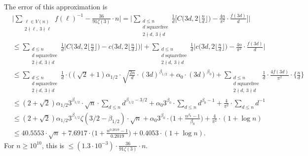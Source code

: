\documentclass{article}
\theoremstyle{plain}
\theoremstyle{definition}
\theoremstyle{remark}
\begin{document}
The error of this approximation is
\begin{align*}
&\bigg|\sum_{\substack{\ell\in V(n)\\2\nmid\ell,~3\nmid\ell}}f(\ell)^{-1}-\frac{36}{91\zeta(3)}\cdot n\bigg|
=\bigg|\sum_{\substack{d\leq n\\d\text{ squarefree}\\2\nmid d,~3\nmid d}}\frac{1}{d}\bigg[
C\bigg(3d,2\bigg\lfloor\frac{n}{d}\bigg\rfloor\bigg)
-\frac{4n}{\pi^2}\cdot \frac{f(3d)}{d}
\bigg]\bigg|\\
&\leq\sum_{\substack{d\leq n\\d\text{ squarefree}\\2\nmid d,~3\nmid d}}\frac{1}{d}\bigg|
C\bigg(3d,2\bigg\lfloor\frac{n}{d}\bigg\rfloor\bigg)
-c\bigg(3d,2\bigg\lfloor\frac{n}{d}\bigg\rfloor\bigg)\bigg|
+\sum_{\substack{d\leq n\\d\text{ squarefree}\\2\nmid d,~3\nmid d}}\frac{1}{d}\bigg|c\bigg(3d,2\bigg\lfloor\frac{n}{d}\bigg\rfloor\bigg)-\frac{4n}{\pi^2}\cdot \frac{f(3d)}{d}
\bigg|\\
&\leq\sum_{\substack{d\leq n\\d\text{ squarefree}\\2\nmid d,~3\nmid d}}\frac{1}{d}\cdot\bigg((\sqrt{2}+1)\alpha_{1/2}\cdot \sqrt{\frac{2n}{d}}\cdot (3d)^{\beta_{1/2}}+\alpha_{0}\cdot(3d)^{\beta_{0}}\bigg)
+\sum_{\substack{d\leq n\\d\text{ squarefree}\\2\nmid d,~3\nmid d}}\frac{1}{d}\cdot\frac{4f(3d)}{\pi^2}\cdot \bigg\{\frac{n}{d}\bigg\}\\
&\leq (2+\sqrt{2})\alpha_{1/2}3^{\beta_{1/2}}\cdot\sqrt{n}\cdot\sum_{d\leq n}d^{\beta_{1/2}-3/2}
+\alpha_{0}3^{\beta_{0}}\cdot\sum_{d\leq n}d^{\beta_{0}-1}
+\frac{4}{\pi^2}\cdot\sum_{d\leq n}d^{-1}\\
&\leq (2+\sqrt{2})\alpha_{1/2}3^{\beta_{1/2}}\zeta(3/2-\beta_{1/2})\cdot\sqrt{n}
+\alpha_{0}3^{\beta_{0}}\cdot\bigg(1+\frac{n^{\beta_{0}}-1}{\beta_{0}}\bigg)
+\frac{4}{\pi^2}\cdot(1+\log n)\\
&\leq40.5553\cdot\sqrt{n}
+7.6917\cdot\bigg(1+\frac{n^{0.2019}-1}{0.2019}\bigg)
+0.4053\cdot(1+\log n).
\end{align*}
For $n\geq10^{10}$, this is $\leq (1.3\cdot10^{-3})\cdot \frac{36}{91\zeta(3)}\cdot n$.
\end{document}
